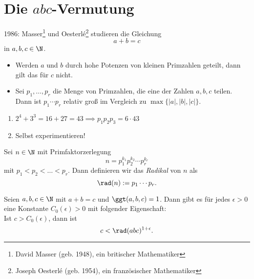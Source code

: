 \chapter{Die $abc$-Vermutung}

1986: Masser\footnote{David Masser (geb. 1948), ein britischer Mathematiker} und Oesterlé\footnote{Joseph Oesterlé (geb. 1954), ein französischer Mathematiker} studieren die Gleichung
\[ a+b=c \]
in $a,b,c \in \N$.

\begin{obs*}
	\begin{itemize}
		\item Werden $a$ und $b$ durch hohe Potenzen von kleinen Primzahlen geteilt, dann gilt das für $c$ nicht.
		\item Sei $p_1,\dotsc,p_r$ die Menge von Primzahlen, die eine der Zahlen $a,b,c$ teilen. Dann ist $p_1 \dotsm p_r$ relativ groß im Vergleich zu $\max\{|a|,|b|,|c|\}$.
	\end{itemize}
\end{obs*}

\begin{exmp*}
	\begin{enumerate}[label={\roman*})]
		\item $2^4+3^3 = 16+27=43 \implies p_1p_2p_3 = 6 \cdot 43$
		\item Selbst experimentieren!
	\end{enumerate}
\end{exmp*}

\begin{defn*} 
	Sei $n \in \N$ mit Primfaktorzerlegung
	\[ n = p_1^{k_1} p_2^{k_2} \dotsm p_r^{k_r} \]
	mit $p_1 < p_2 < \dots < p_r$. Dann definieren wir das \emph{Radikal} von $n$ als 
	\[ \rad(n):= p_1 \dotsm p_r. \]
\end{defn*}

\begin{conj*}
	Seien $a,b,c \in \N$ mit $a+b=c$ und $\ggt(a,b,c)=1$. Dann gibt es für jedes $\epsilon > 0$ eine Konstante $C_0(\epsilon) > 0$ mit folgender Eigenschaft:\\
	Ist $c > C_0(\epsilon)$, dann ist 
	$$c < \rad(abc)^{1+\epsilon}.$$
\end{conj*}
